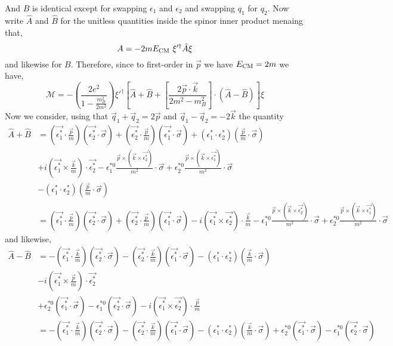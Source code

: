 \documentclass[12pt]{article}
\newcommand{\cM}{\mathcal{M}}
\begin{document}
And $B$ is identical except for swapping $\epsilon_1$ and $\epsilon_2$ and swapping $q_1$ for $q_2$. Now write $\hat{A}$ and $\hat{B}$ for the unitless quantities inside the spinor inner product menaing that,
\[ A = - 2 m E_{\mathrm{CM}} \, \, \xi'^{\dagger} \hat{A} \xi \]
and likewise for $B$. Therefore, since to first-order in $\vec{p}$ we have $E_{\mathrm{CM}} = 2 m$ we have,
\[ \cM = - \left( \frac{2 e^2}{1 - \frac{m_B^2}{2m^2}} \right) \xi'^{\dagger} \left[ \hat{A} + \hat{B} + \left[ \frac{2 \vec{p} \cdot \vec{k}}{2 m^2 - m_B^2} \right] \cdot (\hat{A} - \hat{B}) \right] \xi \]
Now we consider, using that $\vec{q}_1 + \vec{q}_2 = 2 \vec{p}$ and $\vec{q}_1 - \vec{q}_2 = - 2 \vec{k}$ the quantity
\begin{align*}
\hat{A} + \hat{B} &= (\vec{\epsilon_1^*} \cdot \tfrac{\vec{p}}{m}) (\vec{\epsilon^*_2} \cdot \vec{\sigma}) + (\vec{\epsilon_2^*} \cdot \tfrac{\vec{p}}{m}) (\vec{\epsilon^*_1} \cdot \vec{\sigma}) + (\epsilon_1^* \cdot \epsilon_2^*) (\tfrac{\vec{p}}{m} \cdot \vec{\sigma})
\\
& + i (\vec{\epsilon^*_1} \times \tfrac{\vec{k}}{m}) \cdot \vec{\epsilon^*_2} - \epsilon_1^{*0} \frac{\vec{p} \times (\vec{k}  \times \vec{\epsilon_2^*})}{m^2} \cdot \vec{\sigma} +  \epsilon_2^{*0} \frac{\vec{p} \times (\vec{k} \times \vec{\epsilon_1^*})}{m^2} \cdot \vec{\sigma}
\\
& - (\epsilon_1^* \cdot \epsilon_2^*) (\tfrac{\vec{p}}{m} \cdot \vec{\sigma})
\\
& = (\vec{\epsilon_1^*} \cdot \tfrac{\vec{p}}{m}) (\vec{\epsilon^*_2} \cdot \vec{\sigma}) + (\vec{\epsilon_2^*} \cdot \tfrac{\vec{p}}{m}) (\vec{\epsilon^*_1} \cdot \vec{\sigma}) - i (\vec{\epsilon^*_1} \times \vec{\epsilon^*_2}) \cdot \tfrac{\vec{k}}{m} - \epsilon_1^{*0} \frac{\vec{p} \times (\vec{k}  \times \vec{\epsilon_2^*})}{m^2} \cdot \vec{\sigma} +  \epsilon_2^{*0} \frac{\vec{p} \times (\vec{k} \times \vec{\epsilon_1^*})}{m^2} \cdot \vec{\sigma}
\end{align*}
and likewise,
\begin{align*}
\hat{A} - \hat{B} &= - (\vec{\epsilon_1^*} \cdot \tfrac{\vec{k}}{m}) (\vec{\epsilon^*_2} \cdot \vec{\sigma}) - (\vec{\epsilon_2^*} \cdot \tfrac{\vec{k}}{m}) (\vec{\epsilon^*_1} \cdot \vec{\sigma}) - (\epsilon_1^* \cdot \epsilon_2^*) (\tfrac{\vec{k}}{m} \cdot \vec{\sigma})
\\
& - i (\vec{\epsilon^*_1} \times \tfrac{\vec{p}}{m}) \cdot \vec{\epsilon^*_2}
\\
& + \epsilon_2^{*0} (\vec{\epsilon_1^*} \cdot \vec{\sigma}) - \epsilon_1^{*0} (\vec{\epsilon_2^*} \cdot \vec{\sigma}) - i (\vec{\epsilon_1^*} \times \vec{\epsilon_2^*}) \cdot \tfrac{\vec{p}}{m}
\\
& = - (\vec{\epsilon_1^*} \cdot \tfrac{\vec{k}}{m}) (\vec{\epsilon^*_2} \cdot \vec{\sigma}) - (\vec{\epsilon_2^*} \cdot \tfrac{\vec{k}}{m}) (\vec{\epsilon^*_1} \cdot \vec{\sigma}) - (\epsilon_1^* \cdot \epsilon_2^*) (\tfrac{\vec{k}}{m} \cdot \vec{\sigma}) + \epsilon_2^{*0} (\vec{\epsilon_1^*} \cdot \vec{\sigma}) - \epsilon_1^{*0} (\vec{\epsilon_2^*} \cdot \vec{\sigma})
\end{align*}
\end{document}
